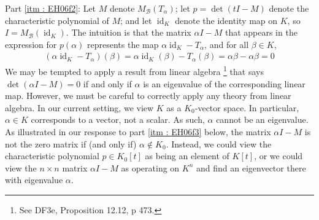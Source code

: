 \documentclass[oneside, english, 11pt]{article}
\DeclareMathOperator{\identityMap}{id}
\begin{document}
Part \ref{itm : EH06f2}: Let $M$ denote $M_{\mathcal{B}}(T_{\alpha})$; let $p = \det(t I - M)$ denote the characteristic polynomial of $M$; and let $\identityMap_{K}$ denote the identity map on $K$, so $I = M_{\mathcal{B}}(\identityMap_{K})$. The intuition is that the matrix $\alpha I - M$ that appears in the expression for $p(\alpha)$ represents the map $\alpha \identityMap_{K} - T_{\alpha}$, and for all $\beta \in K$,
\begin{align*}
(\alpha \identityMap_{K} - T_{\alpha})(\beta)
=
\alpha \identityMap_{K}(\beta) - T_{\alpha}(\beta)
=
\alpha \beta - \alpha \beta
=
0
\end{align*}
We may be tempted to apply a result from linear algebra%
\footnote{See DF3e, Proposition 12.12, p 473.} %
that says $\det(\alpha I - M) = 0$ if and only if $\alpha$ is an eigenvalue of the corresponding linear map. However, we must be careful to correctly apply any theory from linear algebra. In our current setting, we view $K$ as a $K_{0}$-vector space. In particular, $\alpha \in K$ corresponds to a vector, not a scalar. As such, $\alpha$ cannot be an eigenvalue. As illustrated in our response to part \ref{itm : EH06f3} below, the matrix $\alpha I - M$ is not the zero matrix if (and only if) $\alpha \notin K_{0}$. Instead, we could view the characteristic polynomial $p \in K_{0}[t]$ as being an element of $K[t]$, or we could view the $n \times n$ matrix $\alpha I - M$ as operating on $K^{n}$ and find an eigenvector there with eigenvalue $\alpha$.%
\end{document}

